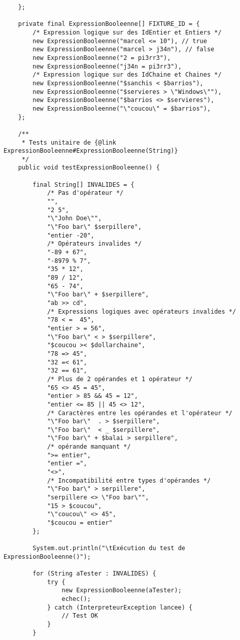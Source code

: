 \begin{enum}
\begin{verbatim}
    };
        
    private final ExpressionBooleenne[] FIXTURE_ID = {
        /* Expression logique sur des IdEntier et Entiers */
        new ExpressionBooleenne("marcel <= 10"), // true
        new ExpressionBooleenne("marcel > j34n"), // false
        new ExpressionBooleenne("2 = pi3rr3"),
        new ExpressionBooleenne("j34n = pi3rr3"),
        /* Expression logique sur des IdChaine et Chaines */
        new ExpressionBooleenne("$sanchis < $barrios"),
        new ExpressionBooleenne("$servieres > \"Windows\""),
        new ExpressionBooleenne("$barrios <> $servieres"),
        new ExpressionBooleenne("\"coucou\" = $barrios"),
    };

    /** 
     * Tests unitaire de {@link ExpressionBooleenne#ExpressionBooleenne(String)}
     */
    public void testExpressionBooleenne() {
        
        final String[] INVALIDES = {
            /* Pas d'opérateur */
            "",
            "2 5",
            "\"John Doe\"",
            "\"Foo bar\" $serpillere",
            "entier -20",
            /* Opérateurs invalides */
            "-89 + 67",
            "-8979 % 7",
            "35 * 12",
            "89 / 12",
            "65 - 74",
            "\"Foo bar\" + $serpillere",
            "ab >> cd",
            /* Expressions logiques avec opérateurs invalides */
            "78 < =  45",
            "entier > = 56",
            "\"Foo bar\" < > $serpillere",
            "$coucou >< $dollarchaine",
            "78 => 45",
            "32 =< 61",
            "32 == 61",
            /* Plus de 2 opérandes et 1 opérateur */
            "65 <> 45 = 45",
            "entier > 85 && 45 = 12",
            "entier <= 85 || 45 <> 12",
            /* Caractères entre les opérandes et l'opérateur */
            "\"Foo bar\"  . > $serpillere",
            "\"Foo bar\"  < _ $serpillere",
            "\"Foo bar\" + $balai > serpillere",
            /* opérande manquant */
            ">= entier",
            "entier =",
            "<>",
            /* Incompatibilité entre types d'opérandes */
            "\"Foo bar\" > serpillere",
            "serpillere <> \"Foo bar\"",
            "15 > $coucou",
            "\"coucou\" <> 45",
            "$coucou = entier"
        };

        System.out.println("\tExécution du test de ExpressionBooleenne()");
        
        for (String aTester : INVALIDES) {
            try {
                new ExpressionBooleenne(aTester);
                echec();
            } catch (InterpreteurException lancee) {
                // Test OK
            }
        }
        

\end{verbatim}
\end{enum}
